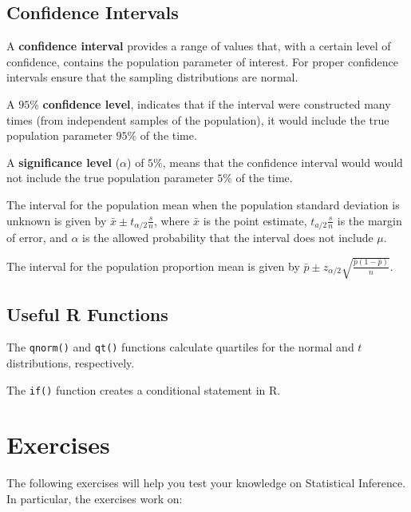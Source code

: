 \documentclass[
  letterpaper,
  DIV=11,
  numbers=noendperiod]{scrreprt}
\begin{document}
\hypertarget{confidence-intervals}{%
\subsection*{Confidence Intervals}\label{confidence-intervals}}

A \textbf{confidence interval} provides a range of values that, with a
certain level of confidence, contains the population parameter of
interest. For proper confidence intervals ensure that the sampling
distributions are normal.

A \(95\)\% \textbf{confidence level}, indicates that if the interval
were constructed many times (from independent samples of the
population), it would include the true population parameter \(95\)\% of
the time.

A \textbf{significance level} (\(\alpha\)) of \(5\)\%, means that the
confidence interval would would not include the true population
parameter \(5\)\% of the time.

The interval for the population mean when the population standard
deviation is unknown is given by
\(\bar x \pm t_{\alpha/2} \frac {s}{n}\), where \(\bar x\) is the point
estimate, \(t_{a/2} \frac {s}{n}\) is the margin of error, and
\(\alpha\) is the allowed probability that the interval does not include
\(\mu\).

The interval for the population proportion mean is given by
\(\bar p \pm z_{\alpha/2} \sqrt{\frac {\bar p (1-\bar p)}{n}}\).

\hypertarget{useful-r-functions-11}{%
\subsection*{Useful R Functions}\label{useful-r-functions-11}}

The \texttt{qnorm()} and \texttt{qt()} functions calculate quartiles for
the normal and \(t\) distributions, respectively.

The \texttt{if()} function creates a conditional statement in R.

\hypertarget{exercises-11}{%
\section{Exercises}\label{exercises-11}}

The following exercises will help you test your knowledge on Statistical
Inference. In particular, the exercises work on:
\end{document}
